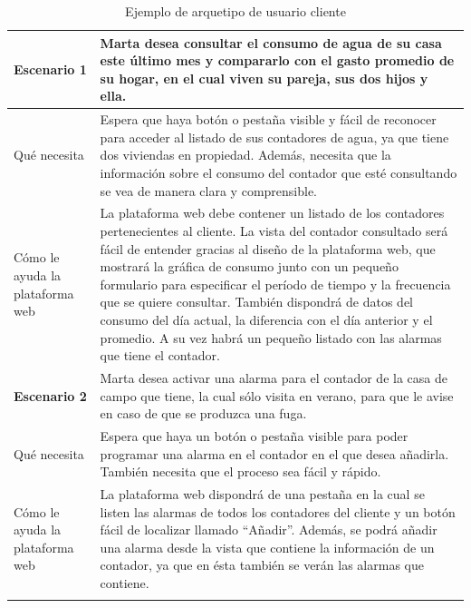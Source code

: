 \documentclass[pdftex,11pt,a4paper]{book}
\begin{document}
\begin{center}
\begin{longtable}{|m{3cm}|m{11cm}|}
\hline

\textbf{Escenario 1} & Marta desea consultar el consumo de agua de su casa este último mes y compararlo con el gasto promedio de su hogar, en el cual viven su pareja, sus dos hijos y ella. 
\\ \hline
Qué necesita & Espera que haya botón o pestaña visible y fácil de  reconocer para acceder al listado de sus contadores de agua, ya que tiene dos viviendas en propiedad. \break \break
Además, necesita que la información sobre el consumo del contador que esté consultando se vea de manera clara y comprensible. 
\\ \hline
\raggedright{Cómo le ayuda la \mbox{plataforma} web} &  La plataforma web debe contener un  listado de los contadores pertenecientes al cliente.  \break \break
La vista del contador consultado será fácil de entender gracias al diseño de la plataforma web, que mostrará la gráfica de consumo junto con un pequeño formulario para especificar el período de tiempo y la frecuencia que se quiere consultar.  \break \break
También dispondrá de datos del consumo del día actual, la diferencia con el día anterior y el promedio.  \break \break
A su vez habrá un pequeño listado con las alarmas que tiene el contador.
\\ \hline
\textbf{Escenario 2} & Marta desea activar una alarma para el contador de la casa de campo que tiene, la cual sólo visita en verano, para que le avise en caso de que se produzca una fuga.    
\\ \hline
Qué necesita & Espera que haya un botón o pestaña visible para poder programar una alarma en el contador en el que desea añadirla. \break \break
También necesita que el proceso sea fácil y rápido.
\\ \hline
\raggedright{Cómo le ayuda la \mbox{plataforma} web} & La plataforma web dispondrá de una pestaña en la cual se listen las alarmas de todos los contadores del cliente y un botón fácil de localizar llamado “Añadir”. \break \break
Además, se podrá añadir una alarma desde la vista que contiene la información de un contador, ya que en ésta también se verán las alarmas que contiene.
\\ \hline

\caption{Ejemplo de arquetipo de usuario cliente} \label{tablalarga:tablaArquetipo1}
\end{longtable}
\end{center}
\vspace{-1,5cm}
\end{document}
